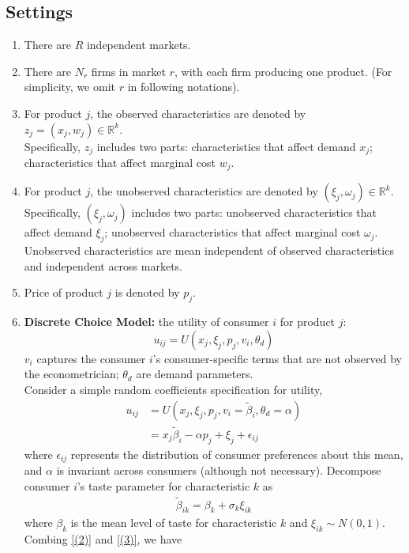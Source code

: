 \documentclass[11pt]{elegantbook}
\begin{document}
\subsection{Settings}
\begin{enumerate}
    \item There are $R$ independent markets.
    \item There are $N_r$ firms in market $r$, with each firm producing one product. (For simplicity, we omit $r$ in following notations).
    \item For product $j$, the observed characteristics are denoted by $z_{j}=(x_j,w_j)\in \mathbb{R}^k$.\\ Specifically, $z_j$ includes two parts:
    \subitem characteristics that affect demand $x_j$;
    \subitem characteristics that affect marginal cost $w_j$.
    \item For product $j$, the unobserved characteristics are denoted by $(\xi_j,\omega_j)\in \mathbb{R}^k$.\\ Specifically, $(\xi_j,\omega_j)$ includes two parts:
    \subitem unobserved characteristics that affect demand $\xi_j$;
    \subitem unobserved characteristics that affect marginal cost $\omega_j$.\\
    Unobserved characteristics are mean independent of observed characteristics and independent across markets.
    \item Price of product $j$ is denoted by $p_j$.
    \item \textbf{Discrete Choice Model:} the utility of consumer $i$ for product $j$: $$u_{ij}=U(x_j,\xi_j,p_j,v_i,\theta_d)$$
    \subitem $v_i$ captures the consumer $i$'s consumer-specific terms that are not observed by the econometrician;
    \subitem $\theta_d$ are demand parameters.\\
    Consider a simple random coefficients specification for utility,
    \begin{equation}
        \begin{aligned}
            u_{ij}&=U(x_j,\xi_j,p_j,v_i=\tilde{\beta}_i,\theta_d=\alpha)\\
            &=x_j\tilde{\beta}_i-\alpha p_j+\xi_j+\epsilon_{ij}
        \end{aligned}
        \tag{(2)}
        \label{(2)}
    \end{equation}
    where $\epsilon_{ij}$ represents the distribution of consumer preferences about this mean, and $\alpha$ is invariant across consumers (although not necessary).
    \subitem Decompose consumer $i$'s taste parameter for characteristic $k$ as
    \begin{equation}
        \begin{aligned}
            \tilde{\beta}_{ik}=\beta_k+\sigma_k\xi_{ik}
        \end{aligned}
        \tag{(3)}
        \label{(3)}
    \end{equation}
    where $\beta_k$ is the mean level of taste for characteristic $k$ and $\xi_{ik}\sim N(0,1)$.\\
    Combing \ref{(2)} and \ref{(3)}, we have
\end{enumerate}
\end{document}
